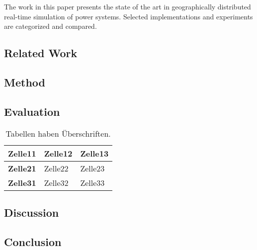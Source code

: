 \documentclass[a4paper,ngerman]{atseminar}
\begin{document}
The work in this paper presents the state of the art in geographically distributed real-time simulation of power systems. Selected implementations and experiments are categorized and compared. 


\subsection{Related Work}




\subsection{Method}


\subsection{Evaluation}


\begin{table}[h]
\centering
\caption{Tabellen haben Überschriften.}
\begin{tabular}{l|ll}
  \textbf{Zelle11} & \textbf{Zelle12} & \textbf{Zelle13} \\
  \hline
  \textbf{Zelle21} & Zelle22 & Zelle23 \\
  \textbf{Zelle31} & Zelle32 & Zelle33 \\
  
\end{tabular}
\label{XY:tab:interessant}
\end{table}

\subsection{Discussion}


\subsection{Conclusion}













\end{document}
